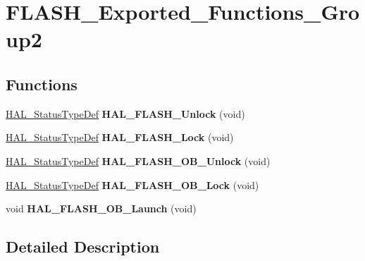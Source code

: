 \hypertarget{group___f_l_a_s_h___exported___functions___group2}{}\section{F\+L\+A\+S\+H\+\_\+\+Exported\+\_\+\+Functions\+\_\+\+Group2}
\label{group___f_l_a_s_h___exported___functions___group2}
\subsection*{Functions}
\begin{DoxyCompactItemize}
\item 
\mbox{\label{group___f_l_a_s_h___exported___functions___group2_ga23d4ff42a8873bac585c92ce4f633747}} 
\hyperlink{stm32f1xx__hal__def_8h_a63c0679d1cb8b8c684fbb0632743478f}{H\+A\+L\+\_\+\+Status\+Type\+Def} {\bfseries H\+A\+L\+\_\+\+F\+L\+A\+S\+H\+\_\+\+Unlock} (void)
\item 
\mbox{\label{group___f_l_a_s_h___exported___functions___group2_gae07eeca0b0aa9d5047f8df88d82f4bcd}} 
\hyperlink{stm32f1xx__hal__def_8h_a63c0679d1cb8b8c684fbb0632743478f}{H\+A\+L\+\_\+\+Status\+Type\+Def} {\bfseries H\+A\+L\+\_\+\+F\+L\+A\+S\+H\+\_\+\+Lock} (void)
\item 
\mbox{\label{group___f_l_a_s_h___exported___functions___group2_ga6e8f380b7a938592f0b6f05d0ebf69c3}} 
\hyperlink{stm32f1xx__hal__def_8h_a63c0679d1cb8b8c684fbb0632743478f}{H\+A\+L\+\_\+\+Status\+Type\+Def} {\bfseries H\+A\+L\+\_\+\+F\+L\+A\+S\+H\+\_\+\+O\+B\+\_\+\+Unlock} (void)
\item 
\mbox{\label{group___f_l_a_s_h___exported___functions___group2_ga3ff599bd7eba88f7a169a537ccbf3e3f}} 
\hyperlink{stm32f1xx__hal__def_8h_a63c0679d1cb8b8c684fbb0632743478f}{H\+A\+L\+\_\+\+Status\+Type\+Def} {\bfseries H\+A\+L\+\_\+\+F\+L\+A\+S\+H\+\_\+\+O\+B\+\_\+\+Lock} (void)
\item 
\mbox{\label{group___f_l_a_s_h___exported___functions___group2_gafcb7356053078fd0d53fc7dc7376fdab}} 
void {\bfseries H\+A\+L\+\_\+\+F\+L\+A\+S\+H\+\_\+\+O\+B\+\_\+\+Launch} (void)
\end{DoxyCompactItemize}


\subsection{Detailed Description}
